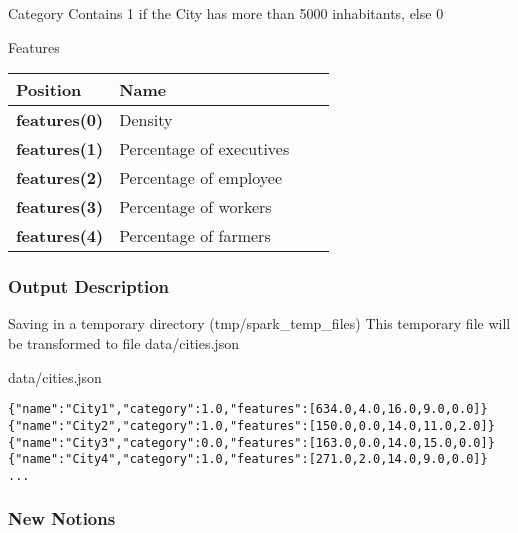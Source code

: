 \documentclass[slidetop,9pt,utf8]{beamer}
\begin{document}
\begin{CJK}{UTF8}{gbsn}
\begin{frame}[fragile]
  \begin{block}{Category}
    Contains 1 if the City has more than 5000 inhabitants, else 0
  \end{block}

  \begin{block}{Features}
    \begin{center}
      \begin{tabular}{|l|l|l|l|}
            \hline 
            \rowcolor{gray} \textbf{Position} & \textbf{Name} \\ \hline
            \textbf{features(0)} & Density \\ \hline
            \textbf{features(1)} & Percentage of executives \\ \hline
            \textbf{features(2)} & Percentage of employee \\ \hline
            \textbf{features(3)} & Percentage of workers \\ \hline
            \textbf{features(4)} & Percentage of farmers \\ \hline
      \end{tabular}
    \end{center}
  \end{block}

\end{frame}

\begin{frame}[fragile]

  \frametitle{Output Description}
  
  \begin{block}{Saving in a temporary directory (tmp/spark\_temp\_files)}
    This temporary file will be transformed to file data/cities.json
  \end{block}


  \begin{block}{data/cities.json}
    \begin{verbatim}
{"name":"City1","category":1.0,"features":[634.0,4.0,16.0,9.0,0.0]}
{"name":"City2","category":1.0,"features":[150.0,0.0,14.0,11.0,2.0]}
{"name":"City3","category":0.0,"features":[163.0,0.0,14.0,15.0,0.0]}
{"name":"City4","category":1.0,"features":[271.0,2.0,14.0,9.0,0.0]}
...
    \end{verbatim}
  \end{block}

\end{frame}

\begin{frame}[fragile]
  \frametitle{New Notions}


\end{frame}
\end{CJK}
\end{document}
